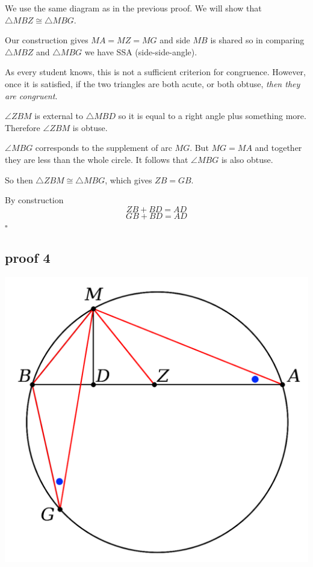 \documentclass[11pt, oneside]{article}
\begin{document}
We use the same diagram as in the previous proof.  We will show that $\triangle MBZ \cong \triangle MBG$.

Our construction gives $MA = MZ = MG$ and side $MB$ is shared so in comparing $\triangle MBZ$ and $\triangle MBG$ we have SSA (side-side-angle).

As every student knows, this is not a sufficient criterion for congruence.  However, once it is satisfied, if the two triangles are both acute, or both obtuse, \emph{then they are congruent}.

$\angle ZBM$ is external to $\triangle MBD$ so it is equal to a right angle plus something more.  Therefore $\angle ZBM$ is obtuse.

$\angle MBG$ corresponds to the supplement of arc $MG$.  But $MG = MA$ and together they are less than the whole circle.  It follows that $\angle MBG$ is also obtuse.

So then $\triangle ZBM \cong \triangle MBG$, which gives $ZB = GB$.

By construction
\[ ZB + BD = AD \]
\[ GB + BD = AD \]
$\square$

\subsection*{proof 4}

\begin{center} \includegraphics [scale=0.40] {bc3.png} \end{center}
\end{document}
